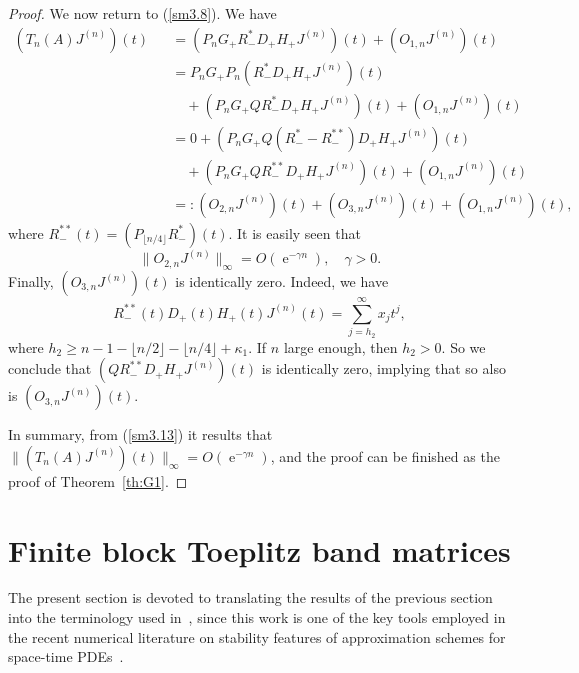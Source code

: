 \documentclass[addpoints,12pt,letter]{article}
\DeclareMathOperator{\e}{e}
\newcommand{\ga}{\gamma}
\newcommand{\ka}{\kappa}
\newcommand{\nf}{\infty}
\renewcommand{\ge}{\geqslant}
\numberwithin{equation}{section}
\theoremstyle{definition}
\begin{document}
\begin{proof}
We now return to (\ref{sm3.8}).
We have
\begin{eqnarray}\label{sm3.13}
(T_{n}(A)J^{(n)})(t)& &=(P_{n}G_{+}R_{-}^{\ast}D_{+}H_{+}J^{(n)})(t)+(O_{1,n}J^{(n)})(t)\nonumber\\
& &=P_{n}G_{+}P_{n}(R_{-}^{\ast}D_{+}H_{+}J^{(n)})(t)\nonumber\\
& & \quad+(P_{n}G_{+}Q R_{-}^{\ast}D_{+}H_{+}J^{(n)})(t)+(O_{1,n}J^{(n)})(t)\nonumber\\
& &=0+(P_{n}G_{+}Q(R_{-}^{\ast}-R_{-}^{**})D_{+}H_{+}J^{(n)})(t)\nonumber\\
& & \quad+(P_{n}G_{+}QR_{-}^{**}D_{+}H_{+}J^{(n)})(t)+(O_{1,n}J^{(n)})(t)\nonumber\\
& &=:(O_{2,n}J^{(n)})(t)+(O_{3,n}J^{(n)})(t)+(O_{1,n}J^{(n)})(t),
\end{eqnarray}
where $R_{-}^{**}(t)=(P_{\lfloor n/4 \rfloor}R_{-}^{\ast})(t)$.
It is easily seen that
\[
\|O_{2,n}J^{(n)}\|_{\nf}=O(\e^{-\ga n}), \quad \ga>0.
\]
Finally, $(O_{3,n} J^{(n)})(t)$
 is identically zero.
Indeed, we have
\[
R_{-}^{**}(t)D_{+}(t)H_{+}(t)J^{(n)}(t)=\sum_{j=h_{2}}^{\nf} x_{j}t^{j},
\]
where $h_{2}\ge n-1-\lfloor n/2 \rfloor-\lfloor n/4 \rfloor+\ka_{1}$.
If $n$ large enough, then $h_{2}>0$.
So we conclude that $(Q R_{-}^{**}D_{+}H_{+}J^{(n)})(t)$ is identically zero, implying that so also is $(O_{3,n} J^{(n)})(t)$.

In summary, from (\ref{sm3.13}) it results that $\|(T_{n}(A)J^{(n)})(t)\|_{\nf}=O(\e^{-\ga n})$, and the proof can be finished as the proof of Theorem~\ref{th:G1}.
\end{proof}

\section{Finite block Toeplitz band matrices}\label{sec:connection}

The present section is devoted to translating the results of the previous section into the terminology used in~\cite{AmoBru96}, since this work is one of the key tools employed in the recent numerical literature on stability features of approximation schemes for space-time PDEs~\cite{FeFr26,FeFrLoPe25,FeGo25}.
\end{document}
